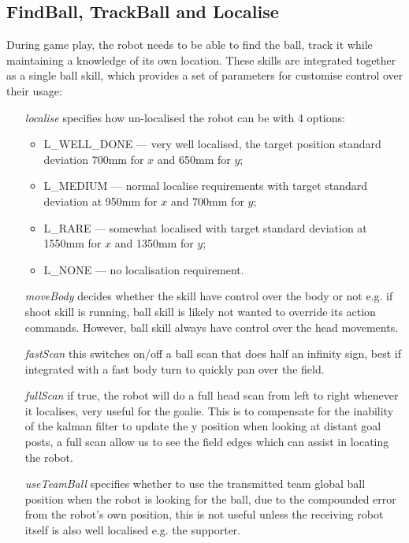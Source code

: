 \documentclass[pdftex,11pt,a4paper]{report}
\begin{document}
\subsection{FindBall, TrackBall and Localise}
During game play, the robot needs to be able to find the ball, track it while maintaining a knowledge of its own location. These skills are integrated together as a single ball skill, which provides a set of parameters for customise control over their usage:
\begin{itemize}
  \item[\emph{localise}] specifies how un-localised the robot can be with 4 options:
    \begin{itemize}
      \item L\_WELL\_DONE --- very well localised, the target position standard deviation 700mm for $x$ and 650mm for $y$;
      \item L\_MEDIUM --- normal localise requirements with target standard deviation at 950mm for $x$ and 700mm for $y$;
      \item L\_RARE --- somewhat localised with target standard deviation at 1550mm for $x$ and 1350mm for $y$;
      \item L\_NONE --- no localisation requirement.
    \end{itemize}
  \item[\emph{moveBody}] decides whether the skill have control over the body or not e.g. if shoot skill is running, ball skill is likely not wanted to override its action commands. However, ball skill always have control over the head movements.
  \item[\emph{fastScan}] this switches on/off a ball scan that does half an infinity sign, best if integrated with a fast body turn to quickly pan over the field. 
  \item[\emph{fullScan}] if true, the robot will do a full head scan from left to right whenever it localises, very useful for the goalie. This is to compensate for the inability of the kalman filter to update the y position when looking at distant goal posts, a full scan allow us to see the field edges which can assist in locating the robot. 
  \item[\emph{useTeamBall}] specifies whether to use the transmitted team global ball position when the robot is looking for the ball, due to the compounded error from the robot's own position, this is not useful unless the receiving robot itself is also well localised e.g. the supporter.
\end{itemize}
\end{document}
